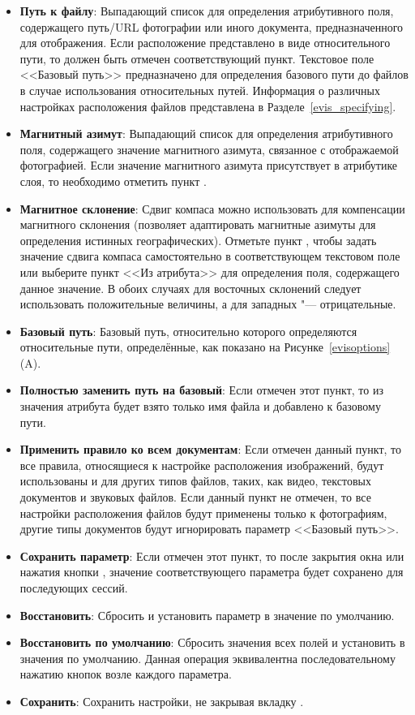 \begin{itemize}[label=--]
\item \textbf{Путь к файлу}: Выпадающий список для определения атрибутивного
поля, содержащего путь/URL фотографии или иного документа,
предназначенного для отображения. Если расположение представлено в виде
относительного пути, то должен быть отмечен соответствующий пункт.
Текстовое поле <<Базовый путь>> предназначено для определения базового пути до
файлов в случае использования относительных путей. Информация о
различных настройках расположения файлов представлена в Разделе~\ref{evis_specifying}.
\item \textbf{Магнитный азимут}: Выпадающий список для определения
атрибутивного поля, содержащего значение магнитного азимута, связанное с
отображаемой фотографией. Если значение магнитного азимута присутствует в
атрибутике слоя, то необходимо отметить пункт .
\item \textbf{Магнитное склонение}: Сдвиг компаса можно использовать для
компенсации магнитного склонения (позволяет адаптировать магнитные азимуты для
определения истинных географических). Отметьте пункт ,
чтобы задать значение сдвига компаса самостоятельно в соответствующем текстовом
поле или выберите пункт <<Из атрибута>> для определения поля, содержащего данное
значение. В обоих случаях для восточных склонений следует использовать
положительные величины, а для западных "--- отрицательные.
\item \textbf{Базовый путь}: Базовый путь, относительно которого определяются
относительные пути, определённые, как показано на Рисунке~\ref{evisoptions} (A).
\item \textbf{Полностью заменить путь на базовый}: Если отмечен этот пункт,
то из значения атрибута будет взято только имя файла и добавлено к базовому
пути.
\item \textbf{Применить правило ко всем документам}: Если отмечен данный
пункт, то все правила, относящиеся к настройке расположения изображений, будут
использованы и для других типов файлов, таких, как видео, текстовых документов и
звуковых файлов. Если данный пункт не отмечен, то все настройки расположения
файлов будут применены только к фотографиям, другие типы документов будут
игнорировать параметр <<Базовый путь>>.
\item \textbf{Сохранить параметр}: Если отмечен этот пункт, то
после закрытия окна или нажатия кнопки , значение соответствующего
параметра будет сохранено для последующих сессий.
\item \textbf{Восстановить}: Сбросить и установить параметр в значение по
умолчанию.
\item \textbf{Восстановить по умолчанию}: Сбросить значения всех полей и
установить в значения по умолчанию. Данная операция эквивалентна
последовательному нажатию кнопок  возле каждого параметра.
\item \textbf{Сохранить}: Сохранить настройки, не закрывая вкладку
.
\end{itemize}

